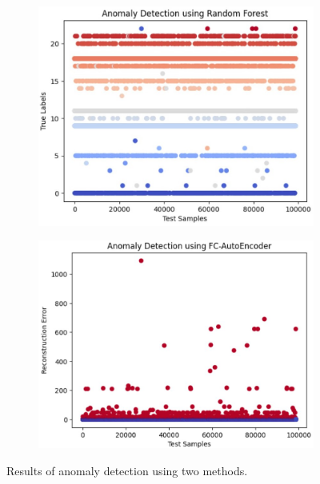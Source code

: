 \documentclass[conference]{IEEEtran}
\begin{document}
\begin{figure}[!htbp]
\centering
\captionsetup[subfigure]{justification=centering}
\captionsetup{justification=centering}

  \begin{subfigure}{0.48\linewidth}
  \centering
    \includegraphics[width=\linewidth]{anamoly_forest.jpg}
    \caption{}
    \label{plots:1-a}
  \end{subfigure}
  \hfill
  \begin{subfigure}{0.48\linewidth}
  \centering
    \includegraphics[width=\linewidth]{anamoly_auto.jpg}
    \caption{}
    \label{plots:1-b}
  \end{subfigure}

  \caption{Results of anomaly detection using two methods.}
  \label{fig:baseline1}
\end{figure}
\end{document}
